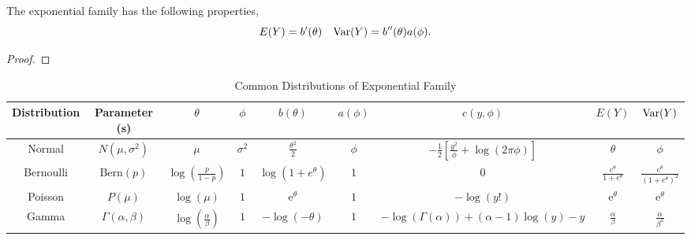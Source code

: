 \begin{property}
	The exponential family has the following properties,
	\begin{equation*}
		E(Y)=b^{\prime}(\theta)\quad\mathrm{Var}(Y)=b^{\prime\prime}(\theta)a(\phi).
	\end{equation*}
\end{property}

\begin{proof}

\end{proof}

\begin{landscape}
	\begin{table}[hpt]
		\centering
		\small
		\caption{Common Distributions of Exponential Family}
		\begin{tabular}{ccccccccc}
			\toprule
			Distribution & Parameter (s)            & \(\theta\)                                & \(\phi\)       & \(b(\theta)\)                     & \(a(\phi)\) & \(c(y,\phi)\)                                                   & \(E(Y)\)                            & \(\mathrm{Var}(Y)\)                                          \\
			\midrule
			Normal       & \(N(\mu,\sigma^2)\)      & \(\mu\)                                   & \(\sigma^{2}\) & \(\frac{\theta^{2}}{2}\)          & \(\phi\)    & \(-\frac{1}{2}\left[\frac{y^{2}}{\phi}+\log (2\pi\phi)\right]\) & \(\theta\)                          & \(\phi\)                                             \\
			Bernoulli    & \(\text{Bern}(p)\)       & \(\log\left(\frac{p}{1-p}\right)\)        & \(1\)          & \(\log\left(1+e^{\theta}\right)\) & \(1\)       & \(0\)                                                           & \(\frac{e^{\theta}}{1+e^{\theta}}\) & \(\frac{e^{\theta}}{\left(1+e^{\theta}\right)^{2}}\) \\
			Poisson      & \(P(\mu)\)               & \(\log(\mu)\)                             & \(1\)          & \(\mathrm{e}^{\theta}\)           & \(1\)       & \(-\log(y!)\)                                                   & \(\mathrm{e}^{\theta}\)             & \(\mathrm{e}^{\theta}\)                              \\
			Gamma        & \(\Gamma(\alpha,\beta)\) & \(\log\left(\frac{\alpha}{\beta}\right)\) & \(1\)          & \(-\log(-\theta)\)                & \(1\)       & \(-\log\left(\Gamma(\alpha)\right)+(\alpha-1)\log(y)-y\)        & \(\frac{\alpha}{\beta}\)            & \(\frac{\alpha}{\beta^{2}}\)                         \\
			\bottomrule
		\end{tabular}
	\end{table}
\end{landscape}

